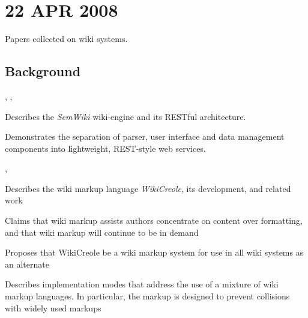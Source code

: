 %
%


\chapter{22 APR 2008}
\label{cha:read_2008_04_22:22-apr-2008}

Papers collected on wiki systems.

%
%
%

\section{Background}
\label{sec:read_2008_04_22:backgr}

%

\begin{albResearchNote}{%
    \citet{volkel06:_semwik}%
  }{%
    , , %
  }
\item Describes the \emph{SemWiki} wiki-engine and its RESTful
  architecture.
\item Demonstrates the separation of parser, user interface and data
  management components into lightweight, REST-style web services.
\end{albResearchNote}

%

\begin{albResearchNote}{%
    \citet{sauer07:_wikic}%
  }{%
    , %
  }
\item Describes the wiki markup language \emph{WikiCreole}, its
  development, and related work
\item Claims that wiki markup assists authors concentrate on content
  over formatting, and that wiki markup will continue to be in demand
\item Proposes that WikiCreole be a wiki markup system for use in all
  wiki systems as an alternate
\item Describes implementation modes that address the use of a mixture
  of wiki markup languages.  In particular, the markup is designed to
  prevent collisions with widely used markups
\end{albResearchNote}

%

